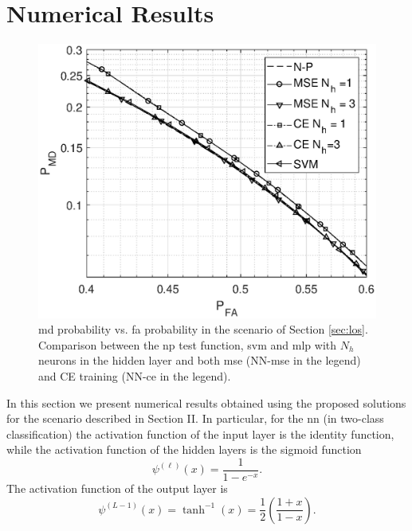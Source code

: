 \documentclass[draftcls,onecolumn,12pt]{IEEEtran}
\begin{document}

 

    


\section{Numerical Results}

\begin{figure}[h]
    \centering
    \includegraphics[width=0.6\columnwidth]{res_com_CE_MSE_SVM.eps}
    \caption{\ac{md} probability vs. \ac{fa} probability in the scenario of Section \ref{sec:los}. Comparison between the \ac{np} test function, \ac{svm} and \ac{mlp} with $N_h$ neurons in the hidden layer and both \ac{mse} (NN-\ac{mse} in the legend) and CE training (NN-\ac{ce} in the legend).}
    \label{fig:ceVSmse}
\end{figure}

In this section we present numerical results obtained using the proposed solutions for the scenario described in Section II. In particular, for the \ac{nn} (in two-class classification) the activation function of the input layer is the identity function, while the activation function of the hidden layers is the sigmoid function
\begin{equation}
\psi^{(\ell)}(x) = \frac{1}{1-e^{-x}}.
\end{equation}
The activation function of the output layer is 
\begin{equation}
\psi^{(L-1)}(x)=\tanh^{-1}(x) = \frac{1}{2} \left( \frac{1+x}{1-x} \right).
\end{equation}
\end{document}
